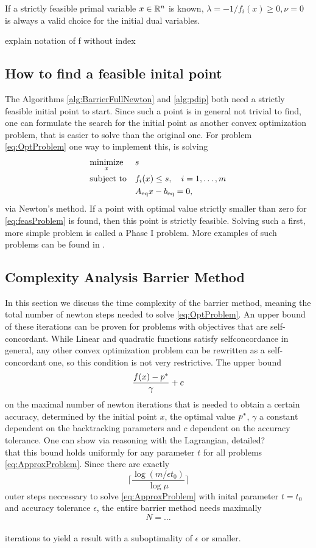 \begin{remark}
	If a strictly feasible primal variable $ x \in \mathbb{R}^n $ is known, $ \lambda= -1/f_i(x) \geq 0, \nu=0 $ is always a valid choice for the initial dual variables.
\end{remark}

\todo explain notation of f without index
\subsection{How to find a feasible inital point}
The Algorithms \ref{alg:BarrierFullNewton} and \ref{alg:pdip} both need a strictly feasible initial point to start. Since such a point is in general not trivial to find, one can formulate the search for the initial point as another convex optimization problem, that is easier to solve than the original one.  
For problem \eqref{eq:OptProblem} one way to implement this, is solving
\begin{equation}
	\begin{aligned} & \underset{x}{\text{minimize}} & & s\\ & \text{subject to} & & f_i(x) \leq s, \quad i=1,\dots,m\\ & & &{A}_{\mathrm{eq}} x - {b}_{\mathrm{eq}} = 0, \; \end{aligned}
	\label{eq:feasProblem}
\end{equation}
via Newton's method. If a point with optimal value strictly smaller than zero for \eqref{eq:feasProblem} is found, then this point is strictly feasible. Solving such a first, more simple problem is called a Phase I problem. More examples of such problems can be found in \cite{BV}.


\subsection{Complexity Analysis Barrier Method}
In this section we discuss the time complexity of the barrier method, meaning the total number of newton steps needed to solve \eqref{eq:OptProblem}. 
An upper bound of these iterations can be proven for problems with objectives that are self-concordant. While Linear and quadratic functions satisfy selfconcordance in general, any other convex optimization problem can be rewritten as a self-concordant one, so this condition is not very restrictive.
The upper bound
\begin{equation}
	\frac{f(x) - p^*}{\gamma} + c
\end{equation}
on the maximal number of newton iterations that is needed to obtain a certain accuracy, determined by the initial point $ x $, the optimal value $ p^* $, $ \gamma $ a constant dependent on the backtracking parameters and $ c $ dependent on the accuracy tolerance. One can show via reasoning with the Lagrangian, \todo detailed?\\
that this bound holds uniformly for any parameter $ t $ for all problems \eqref{eq:ApproxProblem}.
 Since there are exactly \[ \lceil \frac{\log(m/\epsilon t_0)}{\log \mu} \rceil \] outer steps neccessary to solve  \eqref{eq:ApproxProblem} with inital parameter $ t=t_0  $ and accuracy tolerance $ \epsilon $, the entire barrier method needs maximally
 \[ N = \dots  \] \todo\\
 iterations to yield a result with a suboptimality of $ \epsilon $ or smaller.


